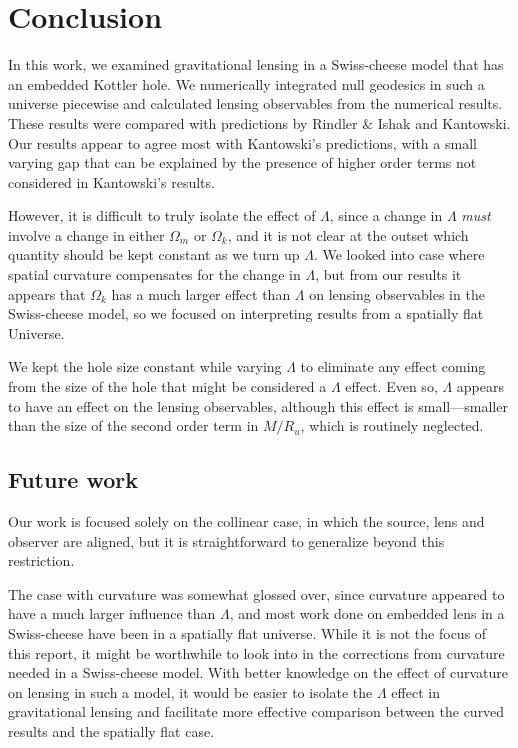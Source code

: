 \chapter{Conclusion}
\label{chapter:conclusion}

In this work, we examined gravitational lensing in a Swiss-cheese model that has an embedded Kottler hole. We numerically integrated null geodesics in such a universe piecewise and calculated lensing observables from the numerical results. These results were compared with predictions by Rindler \& Ishak and Kantowski. Our results appear to agree most with Kantowski's predictions, with a small varying gap that can be explained by the presence of higher order terms not considered in Kantowski's results. 

However, it is difficult to truly isolate the effect of $\Lambda$, since a change in $\Lambda$ \emph{must} involve a change in either $\Omega_m$ or $\Omega_k$, and it is not clear at the outset which quantity should be kept constant as we turn up $\Lambda$. We looked into case where spatial curvature compensates for the change in $\Lambda$, but from our results it appears that $\Omega_k$ has a much larger effect than $\Lambda$ on lensing observables in the Swiss-cheese model, so we focused on interpreting results from a spatially flat Universe. 

We kept the hole size constant while varying $\Lambda$ to eliminate any effect coming from the size of the hole that might be considered a $\Lambda$ effect. Even so, $\Lambda$ appears to have an effect on the lensing observables, although this effect is small---smaller than the size of the second order term in $M/R_u$, which is routinely neglected. 

\section{Future work}

Our work is focused solely on the collinear case, in which the source, lens and observer are aligned, but it is straightforward to generalize beyond this restriction. 

The case with curvature was somewhat glossed over, since curvature appeared to have a much larger influence than $\Lambda$, and most work done on embedded lens in a Swiss-cheese have been in a spatially flat universe. While it is not the focus of this report, it might be worthwhile to look into in the corrections from curvature needed in a Swiss-cheese model.  With better knowledge on the effect of curvature on lensing in such a model, it would be easier to isolate the $\Lambda$ effect in gravitational lensing and facilitate more effective comparison between the curved results and the spatially flat case. 

